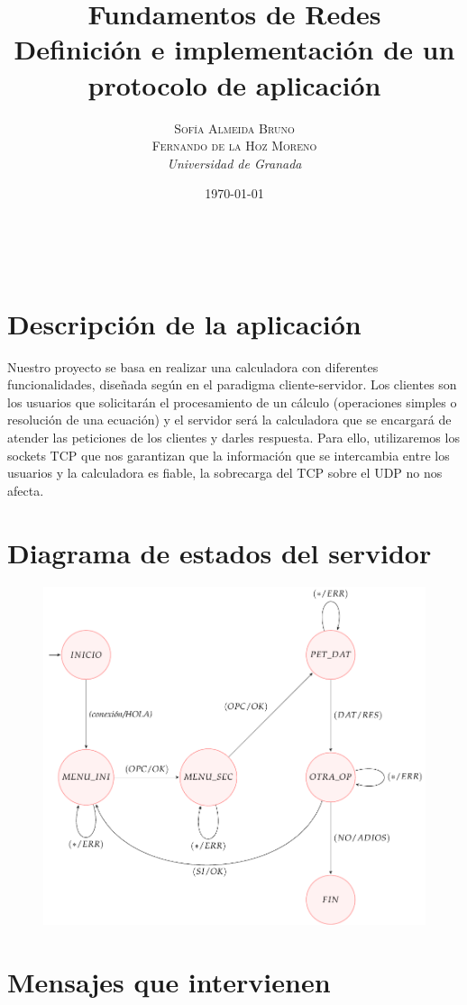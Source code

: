 \documentclass[a4paper, 11pt]{article}
\title{\textbf{Fundamentos de Redes}\\ %
Definición e implementación de un protocolo de aplicación} %
\author{\textsc{Sofía Almeida Bruno\\Fernando de la Hoz Moreno} %
\\{\textit{Universidad de Granada}}} %
\date{\today} %
\makeatletter
\theoremstyle{plain}
\renewcommand{\maketitle}{
  \begin{flushright} %
  
  {\LARGE\@title} %
  
  \vspace{50pt} %
  
  {\large\@author} %
  \\\@date %
  \vspace{40pt} %
  \end{flushright}
}
\makeatother
\begin{document}
\maketitle %
\section{Descripción de la aplicación}
Nuestro proyecto se basa en realizar una calculadora con diferentes funcionalidades, diseñada según en el paradigma cliente-servidor.
Los clientes son los usuarios que solicitarán el procesamiento de un cálculo (operaciones simples o resolución de una ecuación) y el servidor será la calculadora que se encargará de atender las peticiones de los clientes y darles respuesta.
Para ello, utilizaremos los sockets TCP que nos garantizan que la información que se intercambia entre los usuarios y la calculadora es fiable, la sobrecarga del TCP sobre el UDP no nos afecta.

\section{Diagrama de estados del servidor}
	\begin{figure}[h]
		\centering
		\includegraphics[scale=0.55]{./diagrama}
	\end{figure}

\section{Mensajes que intervienen}
\end{document}
